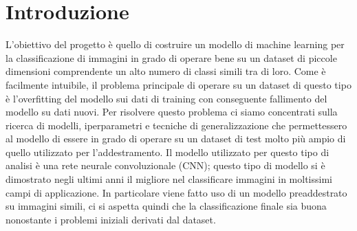 \section{Introduzione}
L'obiettivo del progetto è quello di costruire un modello di machine learning per la classificazione di immagini in grado di operare bene su un dataset di piccole dimensioni comprendente un alto numero di classi simili tra di loro.
Come è facilmente intuibile, il problema principale di operare su un dataset di questo tipo è l'overfitting del modello sui dati di training con conseguente fallimento del modello su dati nuovi. Per risolvere questo problema ci siamo concentrati sulla ricerca di modelli, iperparametri e tecniche di generalizzazione che permettessero al modello di essere in grado di operare su un dataset di test molto più ampio di quello utilizzato per l'addestramento.
Il modello utilizzato per questo tipo di analisi è una rete neurale convoluzionale (CNN); questo tipo di modello si è dimostrato negli ultimi anni il migliore nel classificare immagini in moltissimi campi di applicazione.
In particolare viene fatto uso di un modello preaddestrato su immagini simili, ci si aspetta quindi che la classificazione finale sia buona nonostante i problemi iniziali derivati dal dataset.


